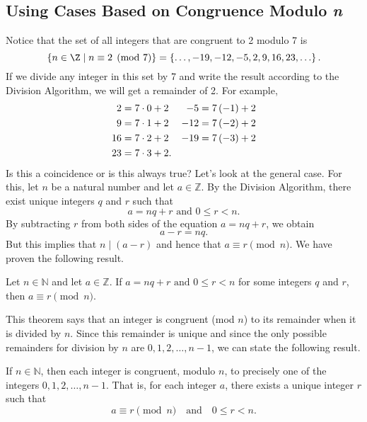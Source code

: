 \subsection*{Using Cases Based on Congruence Modulo \emph{n}}
%
%
Notice that the set of all integers that are congruent to 2  modulo 7 is
\[
\left\{  n \in \Z \mid n \equiv 2 \pmod7 \right\} = 
 \left\{ \ldots , - 19, - 12, - 5, 2, 9, 16, 23, \ldots \right\}.
\]
If we divide any integer in this set by 7 and write the result according to the Division Algorithm, we will get a remainder of 2.  For example,
\begin{align}
2 &= 7 \cdot 0 + 2 &  -5 &= 7 \left( -1 \right) + 2 \notag \\ 
9 &= 7 \cdot 1 + 2 &  -12 &= 7 \left( -2 \right) +2 \notag \\
16 &= 7 \cdot 2 + 2 &  -19 &= 7 \left( -3 \right) +2 \notag \\
23 &= 7 \cdot 3 + 2. &   & \notag 
\notag
\end{align}
%
Is this a coincidence or is this always true?  Let's look at the general case.  For this, let  $n$  be a natural number and let  $a \in \mathbb{Z}$.  By the Division Algorithm, there exist unique integers  $q$  and  $r$  such that
\[
a = nq + r\text{  and  }0 \leq r < n.
\]
By subtracting  $r$  from both sides of the equation  $a = nq + r$, we obtain
\[
a - r = nq.
\]
But this implies that $n \mid \left( a - r \right)$ and hence that  
$a \equiv r \pmod n$.  We have proven the following result.
\begin{theorem}\label{T:congtorem}
Let  $n \in \mathbb{N}$ and let  $a \in \mathbb{Z}$.  If  $a = nq + r\text{  and  }0 \leq r < n$ for some integers  $q$  and  $r$, then  $a \equiv r \pmod n$.
\end{theorem}
%
This theorem says that an integer is congruent (mod $n$) to its remainder when it is divided by  $n$.  Since this remainder is unique and since the only possible remainders for division by $n$  are  $0,1,2, \ldots ,n - 1$, we can state the following result.
%
\begin{corollary}\label{C:congtorem}
If  $n \in \mathbb{N}$, then each integer is congruent, modulo $n$, to precisely one of the integers $0,1,2, \ldots ,n - 1$.  That is, for each integer $a$, there exists a unique integer 
$r$ such that
\[
a \equiv r \pmod n \quad \text{and} \quad 0 \leq r < n.
\]
\end{corollary}

